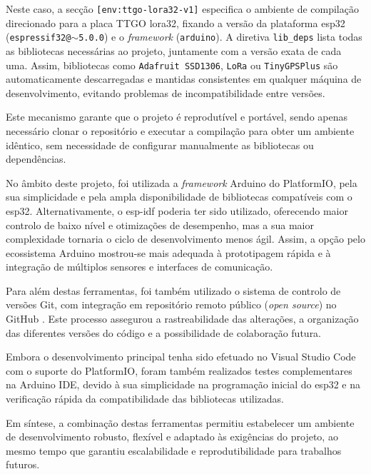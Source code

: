 

Neste caso, a secção \texttt{[env:ttgo-lora32-v1]} especifica o ambiente de compilação direcionado para a placa TTGO \gls{lora}32, fixando a versão da plataforma \gls{esp32} (\texttt{espressif32@$\sim$5.0.0}) e o \emph{framework} (\texttt{arduino}). A diretiva \texttt{lib\_deps} lista todas as bibliotecas necessárias ao projeto, juntamente com a versão exata de cada uma. Assim, bibliotecas como \texttt{Adafruit SSD1306}, \texttt{LoRa} ou \texttt{TinyGPSPlus} são automaticamente descarregadas e mantidas consistentes em qualquer máquina de desenvolvimento, evitando problemas de incompatibilidade entre versões.  

Este mecanismo garante que o projeto é reprodutível e portável, sendo apenas necessário clonar o repositório e executar a compilação para obter um ambiente idêntico, sem necessidade de configurar manualmente as bibliotecas ou dependências.

No âmbito deste projeto, foi utilizada a \emph{framework} Arduino do PlatformIO, pela sua simplicidade e pela ampla disponibilidade de bibliotecas compatíveis com o \gls{esp32}. Alternativamente, o \gls{esp-idf} poderia ter sido utilizado, oferecendo maior controlo de baixo nível e otimizações de desempenho, mas a sua maior complexidade tornaria o ciclo de desenvolvimento menos ágil. Assim, a opção pelo ecossistema Arduino mostrou-se mais adequada à prototipagem rápida e à integração de múltiplos sensores e interfaces de comunicação.  

Para além destas ferramentas, foi também utilizado o sistema de controlo de versões Git, com integração em repositório remoto público (\emph{open source}) no GitHub \cite{github-usv}. Este processo assegurou a rastreabilidade das alterações, a organização das diferentes versões do código e a possibilidade de colaboração futura.  

Embora o desenvolvimento principal tenha sido efetuado no Visual Studio Code com o suporte do PlatformIO, foram também realizados testes complementares na Arduino IDE, devido à sua simplicidade na programação inicial do \gls{esp32} e na verificação rápida da compatibilidade das bibliotecas utilizadas.  

Em síntese, a combinação destas ferramentas permitiu estabelecer um ambiente de desenvolvimento robusto, flexível e adaptado às exigências do projeto, ao mesmo tempo que garantiu escalabilidade e reprodutibilidade para trabalhos futuros.

